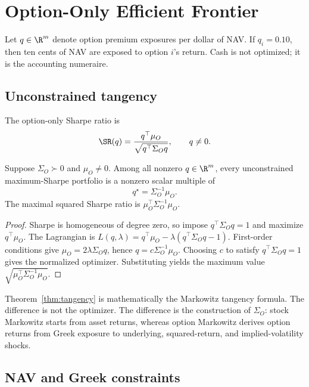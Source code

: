 \section{Option-Only Efficient Frontier}

Let $q\in\R^m$ denote option premium exposures per dollar of NAV.  If
$q_i=0.10$, then ten cents of NAV are exposed to option $i$'s return.
Cash is not optimized; it is the accounting numeraire.

\subsection{Unconstrained tangency}

The option-only Sharpe ratio is
\begin{equation}
   \SR(q)=\frac{q^\top\mu_O}{\sqrt{q^\top\Sigma_Oq}},
   \qquad q\ne0.
   \label{eq:sharpe}
\end{equation}

\begin{theorem}
\label{thm:tangency}
Suppose $\Sigma_O\succ0$ and $\mu_O\ne0$.  Among all nonzero
$q\in\R^m$, every unconstrained maximum-Sharpe portfolio is a nonzero
scalar multiple of
\[
      q^\star = \Sigma_O^{-1}\mu_O .
\]
The maximal squared Sharpe ratio is
$\mu_O^\top\Sigma_O^{-1}\mu_O$.
\end{theorem}

\begin{proof}
Sharpe is homogeneous of degree zero, so impose $q^\top\Sigma_Oq=1$ and
maximize $q^\top\mu_O$.  The Lagrangian is
$L(q,\lambda)=q^\top\mu_O-\lambda(q^\top\Sigma_Oq-1)$.  First-order
conditions give $\mu_O=2\lambda\Sigma_O q$, hence
$q=c\Sigma_O^{-1}\mu_O$.  Choosing $c$ to satisfy
$q^\top\Sigma_Oq=1$ gives the normalized optimizer.  Substituting yields
the maximum value
$\sqrt{\mu_O^\top\Sigma_O^{-1}\mu_O}$.
\end{proof}

\begin{remark}
Theorem~\ref{thm:tangency} is mathematically the Markowitz tangency
formula.  The difference is not the optimizer.  The difference is the
construction of $\Sigma_O$: stock Markowitz starts from asset returns,
whereas option Markowitz derives option returns from Greek exposure to
underlying, squared-return, and implied-volatility shocks.
\end{remark}

\subsection{NAV and Greek constraints}

